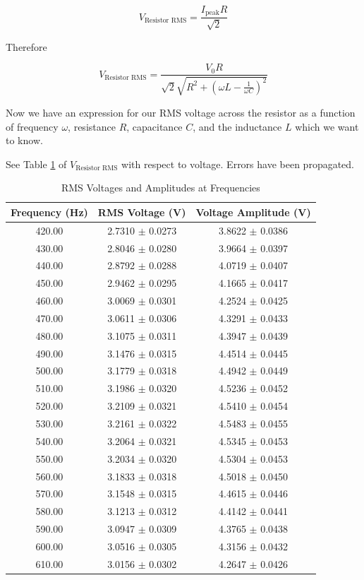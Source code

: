 \documentclass[12pt,letterpaper]{article}
\begin{document}
\begin{equation}
V_{\text{Resistor RMS}} = \frac{I_{\text{peak}} R}{\sqrt{2}}
\end{equation}

Therefore

\begin{equation}
V_{\text{Resistor RMS}} = \frac{V_{0} R}{\sqrt{2} \sqrt{R^2 + \left( \omega L - \frac{1}{\omega C} \right)^2}}
\label{eqn:fit}
\end{equation}

Now we have an expression for our RMS voltage across the resistor as a function of frequency $\omega$, resistance $R$, capacitance $C$, and the inductance $L$ which we want to know.

See Table \ref{tab:voltage_measurements} of $V_{\text{Resistor RMS}}$ with respect to voltage. Errors have been propagated.

\begin{table}[h]
\centering
\begin{tabular}{|c|c|c|}
\hline
Frequency (Hz) & RMS Voltage (V) & Voltage Amplitude (V) \\
\hline
420.00 & 2.7310 $\pm$ 0.0273 & 3.8622 $\pm$ 0.0386 \\
430.00 & 2.8046 $\pm$ 0.0280 & 3.9664 $\pm$ 0.0397 \\
440.00 & 2.8792 $\pm$ 0.0288 & 4.0719 $\pm$ 0.0407 \\
450.00 & 2.9462 $\pm$ 0.0295 & 4.1665 $\pm$ 0.0417 \\
460.00 & 3.0069 $\pm$ 0.0301 & 4.2524 $\pm$ 0.0425 \\
470.00 & 3.0611 $\pm$ 0.0306 & 4.3291 $\pm$ 0.0433 \\
480.00 & 3.1075 $\pm$ 0.0311 & 4.3947 $\pm$ 0.0439 \\
490.00 & 3.1476 $\pm$ 0.0315 & 4.4514 $\pm$ 0.0445 \\
500.00 & 3.1779 $\pm$ 0.0318 & 4.4942 $\pm$ 0.0449 \\
510.00 & 3.1986 $\pm$ 0.0320 & 4.5236 $\pm$ 0.0452 \\
520.00 & 3.2109 $\pm$ 0.0321 & 4.5410 $\pm$ 0.0454 \\
530.00 & 3.2161 $\pm$ 0.0322 & 4.5483 $\pm$ 0.0455 \\
540.00 & 3.2064 $\pm$ 0.0321 & 4.5345 $\pm$ 0.0453 \\
550.00 & 3.2034 $\pm$ 0.0320 & 4.5304 $\pm$ 0.0453 \\
560.00 & 3.1833 $\pm$ 0.0318 & 4.5018 $\pm$ 0.0450 \\
570.00 & 3.1548 $\pm$ 0.0315 & 4.4615 $\pm$ 0.0446 \\
580.00 & 3.1213 $\pm$ 0.0312 & 4.4142 $\pm$ 0.0441 \\
590.00 & 3.0947 $\pm$ 0.0309 & 4.3765 $\pm$ 0.0438 \\
600.00 & 3.0516 $\pm$ 0.0305 & 4.3156 $\pm$ 0.0432 \\
610.00 & 3.0156 $\pm$ 0.0302 & 4.2647 $\pm$ 0.0426 \\
\hline
\end{tabular}
\caption{RMS Voltages and Amplitudes at Frequencies}
\label{tab:voltage_measurements}
\end{table}
\end{document}
